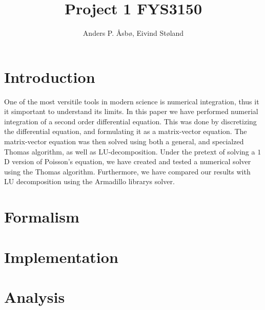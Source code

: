 \documentclass[english,notitlepage,reprint]{revtex4-1}  %
\begin{document}
\title{Project 1 FYS3150}   %
\author{Anders P. Åsbø, Eivind Støland}               %

\noaffiliation                            %

\maketitle
\tableofcontents

\section{Introduction} \label{sec:I}
One of the most versitile tools in modern science is numerical integration, thus it it simportant to understand its limits. In this paper we have performed numerial integration of a second order differential equation. This was done by discretizing the differential equation, and formulating it as a matrix-vector equation. The matrix-vector equation was then solved using both a general, and specialzed Thomas algorithm, as well as LU-decomposition. Under the pretext of solving a \(1\)D version of Poisson's equation, we have created and tested a numerical solver using the Thomas algorithm. Furthermore, we have compared our results with LU decomposition using the Armadillo librarys solver.

\section{Formalism} \label{sec:II}


\section{Implementation} \label{sec:III}

\section{Analysis} \label{sec:IV}
\end{document}
